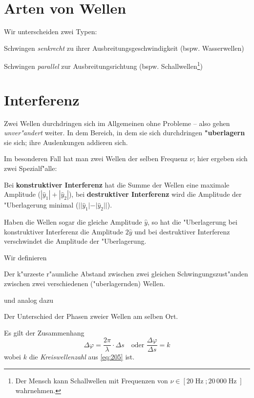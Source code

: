 \section{Arten von Wellen}
\label{kap_arten-von-wellen-1}

Wir unterscheiden zwei Typen:
\begin{description}[\setlabelstyle{\bfseries\slshape}]
\item[\index{Transversalwellen}Transversalwellen]  Schwingen \emph{senkrecht} zu ihrer
   Ausbreitungsgeschwindigkeit (bspw. Wasserwellen)
\item[\index{Longitudialwellen}Longitudialwellen] Schwingen \emph{parallel} zur
   Ausbreitungsrichtung (bspw. Schallwellen\footnote{Der Mensch kann
     Schallwellen mit Frequenzen von $\nu \in [20\operatorname{Hz};
     20\, 000 \operatorname{Hz}]$ wahrnehmen.})
\end{description}




\section{Interferenz}
\label{kap_interferenz}



Zwei Wellen durchdringen sich im Allgemeinen ohne Probleme -- also
gehen \emph{unver"andert} weiter. In dem Bereich, in dem sie sich
durchdringen \textbf{"uberlagern} sie sich; ihre Auslenkungen addieren
sich.

Im besonderen Fall hat man zwei Wellen der selben Frequenz $\nu$; hier
ergeben sich zwei Spezialf"alle:
\begin{Def}
   Bei \textbf{konstruktiver
     Interferenz} hat die Summe der Wellen eine maximale Amplitude
   ($|\hat y_1| +| \hat y_2|$), bei \textbf{destruktiver Interferenz} wird die Amplitude der
   "Uberlagerung minimal ($||\hat y_1| - |\hat y_2||$).
\end{Def}
Haben die Wellen sogar die gleiche Amplitude $\hat y$, so hat die
"Uberlagerung bei konstruktiver Interferenz die Amplitude $2 \hat y$
und bei destruktiver Interferenz verschwindet die Amplitude der
"Uberlagerung.

Wir definieren
\begin{Def}
Der k"urzeste r"aumliche Abstand zwischen zwei gleichen
Schwingungszust"anden zwischen zwei verschiedenen ("uberlagernden) Wellen.
\end{Def}
und analog dazu
\begin{Def}
Der Unterschied der Phasen zweier Wellen am selben Ort.
\end{Def}
Es gilt der Zusammenhang
\begin{equation}
   \label{eq:152}
   \Delta \varphi = \frac{2\pi}{\lambda} \cdot \Delta s \text{ ~ oder
   } \frac{\Delta \varphi}{\Delta s} = k
\end{equation}
wobei $k$ die \emph{Kreiswellenzahl} aus \eqref{eq:205} ist.

